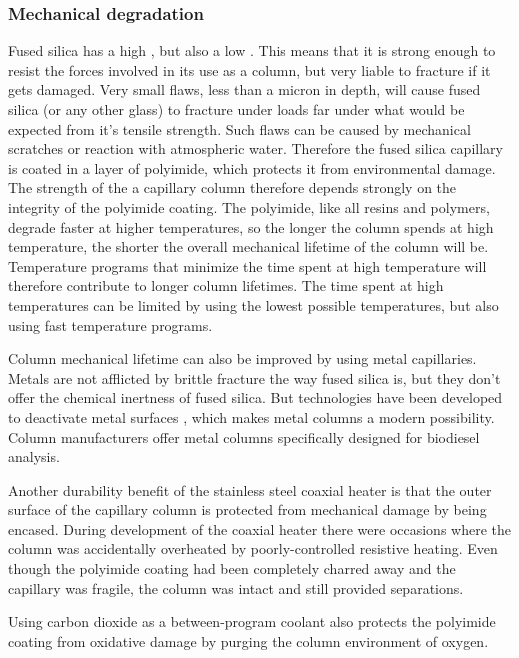 \subsubsection{Mechanical degradation}
Fused silica has a high , but also a low
. This means that it is strong enough to resist the
forces involved in its use as a column, but very liable to fracture if it gets
damaged. Very small flaws, less than a micron in depth, will cause fused silica
(or any other glass) to fracture under loads far under what would be expected
from it's tensile strength. Such flaws can be caused by mechanical scratches or
reaction with atmospheric water. Therefore the fused silica capillary is coated
in a layer of polyimide, which protects it from environmental damage. The
strength of the a capillary column therefore depends strongly on the integrity
of the polyimide coating. The polyimide, like all resins and polymers, degrade
faster at higher temperatures, so the longer the column spends at high
temperature, the shorter the overall mechanical lifetime of the column will be.
Temperature programs that minimize the time spent at high temperature will
therefore contribute to longer column lifetimes. The time spent at high
temperatures can be limited by using the lowest possible temperatures, but also
using fast temperature programs. 

Column mechanical lifetime can also be improved by using metal capillaries.
Metals are not afflicted by brittle fracture the way fused silica is, but they
don't offer the chemical inertness of fused silica. But technologies have been
developed to deactivate metal surfaces \autocite{Smith2002}, which makes metal
columns a modern possibility. Column manufacturers offer metal columns
specifically designed for biodiesel analysis.

Another durability benefit of the stainless steel coaxial heater is that the
outer surface of the capillary column is protected from mechanical damage by
being encased. During development of the coaxial heater there were occasions
where the column was accidentally overheated by poorly-controlled resistive
heating. Even though the polyimide coating had been completely charred away and
the capillary was fragile, the column was intact and still provided separations.

Using carbon dioxide as a between-program coolant also protects the polyimide
coating from oxidative damage by purging the column environment of oxygen.

